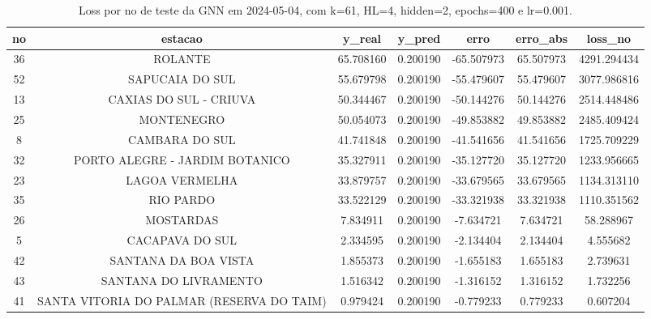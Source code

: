 \begin{table}[h]
\centering
\caption{Loss por no de teste da GNN em 2024-05-04, com k=61, HL=4, hidden=2, epochs=400 e lr=0.001.}
\label{tab:gnn_loss_k61_hl4_h2_e400_d20240504}
\begin{tabular}{ccccccc}
\toprule
no & estacao & y\_real & y\_pred & erro & erro\_abs & loss\_no \\
\midrule
36 & ROLANTE & 65.708160 & 0.200190 & -65.507973 & 65.507973 & 4291.294434 \\
52 & SAPUCAIA DO SUL & 55.679798 & 0.200190 & -55.479607 & 55.479607 & 3077.986816 \\
13 & CAXIAS DO SUL - CRIUVA & 50.344467 & 0.200190 & -50.144276 & 50.144276 & 2514.448486 \\
25 & MONTENEGRO & 50.054073 & 0.200190 & -49.853882 & 49.853882 & 2485.409424 \\
8 & CAMBARA DO SUL & 41.741848 & 0.200190 & -41.541656 & 41.541656 & 1725.709229 \\
32 & PORTO ALEGRE - JARDIM BOTANICO & 35.327911 & 0.200190 & -35.127720 & 35.127720 & 1233.956665 \\
23 & LAGOA VERMELHA & 33.879757 & 0.200190 & -33.679565 & 33.679565 & 1134.313110 \\
35 & RIO PARDO & 33.522129 & 0.200190 & -33.321938 & 33.321938 & 1110.351562 \\
26 & MOSTARDAS & 7.834911 & 0.200190 & -7.634721 & 7.634721 & 58.288967 \\
5 & CACAPAVA DO SUL & 2.334595 & 0.200190 & -2.134404 & 2.134404 & 4.555682 \\
42 & SANTANA DA BOA VISTA & 1.855373 & 0.200190 & -1.655183 & 1.655183 & 2.739631 \\
43 & SANTANA DO LIVRAMENTO & 1.516342 & 0.200190 & -1.316152 & 1.316152 & 1.732256 \\
41 & SANTA VITORIA DO PALMAR (RESERVA DO TAIM) & 0.979424 & 0.200190 & -0.779233 & 0.779233 & 0.607204 \\
\bottomrule
\end{tabular}
\end{table}
